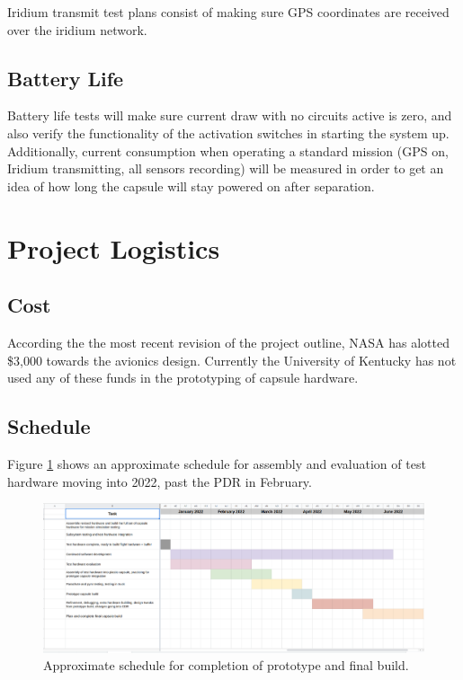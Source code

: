 \documentclass{article}
\begin{document}
Iridium transmit test plans consist of making sure GPS coordinates are received over the iridium network.

\subsection{Battery Life}
Battery life tests will make sure current draw with no circuits active is zero, and also verify the functionality of the activation switches in starting the system up. Additionally, current consumption when operating a standard mission (GPS on, Iridium transmitting, all sensors recording) will be measured in order to get an idea of how long the capsule will stay powered on after separation. 



\section{Project Logistics}
\label{sec:logistics}

\subsection{Cost}
According the the most recent revision of the project outline, NASA has alotted \$3,000 towards the avionics design. Currently the University of Kentucky has not used any of these funds in the prototyping of capsule hardware.


\subsection{Schedule}
Figure \ref{fig:schedule} shows an approximate schedule for assembly and evaluation of test hardware moving into 2022, past the PDR in February.
\begin{figure}[H]
	\centering
	\includegraphics[width=\textwidth]{images/schedule-22.png}
	\caption{Approximate schedule for completion of prototype and final build.}
	\label{fig:schedule}
\end{figure}
\end{document}
